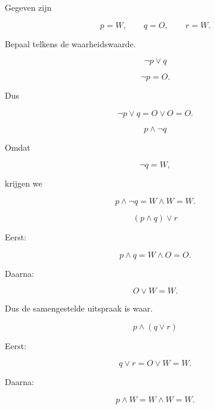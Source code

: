 \documentclass{ximera}
\begin{document}
\begin{oefening}{\oefB \ESS}

Gegeven zijn

\[
p=W,
\qquad
q=O,
\qquad
r=W.
\]

Bepaal telkens de waarheidswaarde.

\begin{question}

\[
\neg p\lor q
\]

\begin{oplossing}

\[
\neg p=O.
\]

Dus

\[
\neg p\lor q
=
O\lor O
=
O.
\]

\end{oplossing}

\end{question}



\begin{question}

\[
p\land\neg q
\]

\begin{oplossing}

Omdat

\[
\neg q=W,
\]

krijgen we

\[
p\land\neg q
=
W\land W
=
W.
\]

\end{oplossing}

\end{question}



\begin{question}

\[
(p\land q)\lor r
\]

\begin{oplossing}

Eerst:

\[
p\land q
=
W\land O
=
O.
\]

Daarna:

\[
O\lor W=W.
\]

Dus de samengestelde uitspraak is waar.

\end{oplossing}

\end{question}



\begin{question}

\[
p\land(q\lor r)
\]

\begin{oplossing}

Eerst:

\[
q\lor r
=
O\lor W
=
W.
\]

Daarna:

\[
p\land W
=
W\land W
=
W.
\]

\end{oplossing}

\end{question}

\end{oefening}
\end{document}

